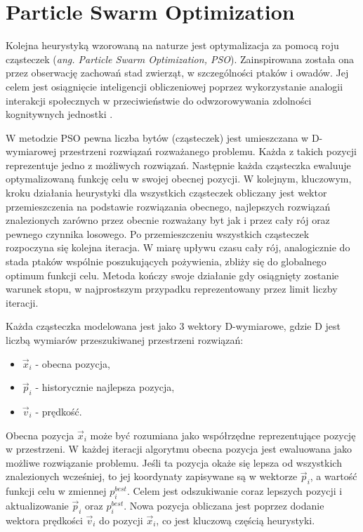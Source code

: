 \documentclass[11pt,a4paper,oneside]{report}
\begin{document}
\section{Particle Swarm Optimization}

Kolejna heurystyką wzorowaną na naturze jest optymalizacja za pomocą roju cząsteczek (\textit{ang. Particle Swarm Optimization, PSO}). Zainspirowana została ona przez obserwację zachowań stad zwierząt, w szczególności ptaków i owadów. Jej celem jest osiągnięcie inteligencji obliczeniowej poprzez wykorzystanie analogii interakcji społecznych w przeciwieństwie do odwzorowywania zdolności kognitywnych jednostki \cite{poli2007particle}. 

W metodzie PSO pewna liczba bytów (cząsteczek) jest umieszczana w D-wymiarowej przestrzeni rozwiązań rozważanego problemu. Każda z takich pozycji reprezentuje jedno z możliwych rozwiązań. Następnie każda cząsteczka ewaluuje optymalizowaną funkcję celu w swojej obecnej pozycji. W kolejnym, kluczowym, kroku działania heurystyki dla wszystkich cząsteczek obliczany jest wektor przemieszczenia na podstawie rozwiązania obecnego, najlepszych rozwiązań znalezionych zarówno przez obecnie rozważany byt jak i przez cały rój oraz pewnego czynnika losowego. Po przemieszczeniu wszystkich cząsteczek rozpoczyna się kolejna iteracja. W miarę upływu czasu cały rój, analogicznie do stada ptaków wspólnie poszukujących pożywienia, zbliży się do globalnego optimum funkcji celu. Metoda kończy swoje działanie gdy osiągnięty zostanie warunek stopu, w najprostszym przypadku reprezentowany przez limit liczby iteracji. 

Każda cząsteczka modelowana jest jako 3 wektory D-wymiarowe, gdzie D jest liczbą wymiarów przeszukiwanej przestrzeni rozwiązań:

\begin{itemize}
\item $\vec{x}_{i}$ - obecna pozycja,
\item $\vec{p}_{i}$ - historycznie najlepsza pozycja,
\item $\vec{v}_{i}$ - prędkość.
\end{itemize}

Obecna pozycja $\vec{x}_{i}$ może być rozumiana jako współrzędne reprezentujące pozycję w przestrzeni. W każdej iteracji algorytmu obecna pozycja jest ewaluowana jako możliwe rozwiązanie problemu. Jeśli ta pozycja okaże się lepsza od wszystkich znalezionych wcześniej, to jej koordynaty zapisywane są w wektorze $\vec{p}_{i}$, a wartość funkcji celu w zmiennej $p^{best}_{i}$. Celem jest odszukiwanie coraz lepszych pozycji i aktualizowanie $\vec{p}_{i}$ oraz $p^{best}_{i}$. Nowa pozycja obliczana jest poprzez dodanie wektora prędkości $\vec{v}_{i}$ do pozycji $\vec{x}_{i}$, co jest kluczową częścią heurystyki.
\end{document}

